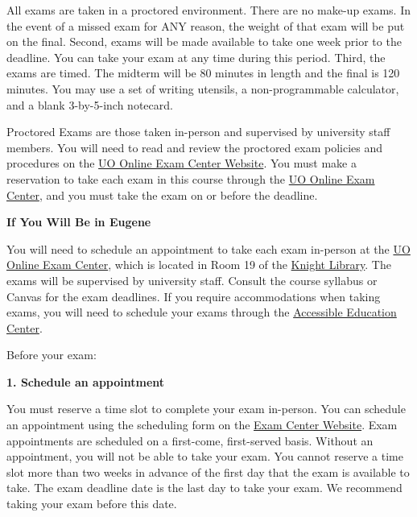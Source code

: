 \documentclass[10pt]{article}
\begin{document}
All exams are taken in a proctored environment. 
There are no make-up exams. 
In the event of a missed exam for ANY reason, the weight of that exam will be put on the final. 
Second, exams will be made available to take one week prior to the deadline. 
You can take your exam at any time during this period. 
Third, the exams are timed. 
The midterm will be 80 minutes in length and the final is 120 minutes. 
You may use a set of writing utensils, a non-programmable calculator, and a blank 3-by-5-inch notecard. 

\bigskip 

\noindent Proctored Exams are those taken in-person and supervised by university staff members. You will need to read and review the proctored exam policies and procedures on the \href{https://online.uoregon.edu/examcenter}{UO Online Exam Center Website}. 
You must make a reservation to take each exam in this course through the \href{https://online.uoregon.edu/}{UO Online Exam Center}, and you must take the exam on or before the deadline. 


\bigskip 
\textbf{If You Will Be in Eugene} 

\bigskip

\noindent You will need to schedule an appointment to take each exam in-person at the \href{https://online.uoregon.edu/examcenter}{UO Online Exam Center}, which is located in Room 19 of the \href{https://online.uoregon.edu/campus-proctoring}{Knight Library}. The exams will be supervised by university staff. Consult the course syllabus or Canvas for the exam deadlines. 
If you require accommodations when taking exams, you will need to schedule your exams through the \href{https://aec.uoregon.edu/}{Accessible Education Center}. 

\bigskip

Before your exam:

\bigskip

\textbf{1. Schedule an appointment}

\noindent You must reserve a time slot to complete your exam in-person. You can schedule an appointment using the scheduling form on the \href{https://online.uoregon.edu/campus-proctoring}{Exam Center Website}. Exam appointments are scheduled on a first-come, first-served basis. Without an appointment, you will not be able to take your exam. 
You cannot reserve a time slot more than two weeks in advance of the first day that the exam is available to take. The exam deadline date is the last day to take your exam. We recommend taking your exam before this date. 
\end{document}

